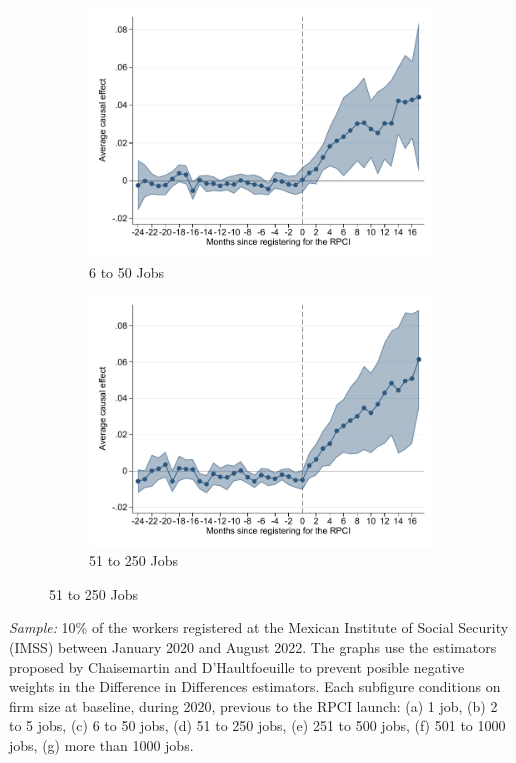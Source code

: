 \documentclass[oneside,11pt]{article}
\begin{document}
\begin{figure}[H]
\begin{center}
    \begin{subfigure}{0.49\textwidth}
    \caption{6 to 50 Jobs}
    \includegraphics[width=\textwidth]{04_Figures/muestra_10porciento/event_study_log_sal_cierre_chaisemartin_firm_size_3.pdf}
    \end{subfigure}
    \begin{subfigure}{0.49\textwidth}
    \caption{51 to 250 Jobs}
    \includegraphics[width=\textwidth]{04_Figures/muestra_10porciento/event_study_log_sal_cierre_chaisemartin_firm_size_4.pdf}
    \end{subfigure}
    
    \end{center}
\end{figure}
\scriptsize{
\noindent \textit{Sample:} 10\% of the workers registered at the Mexican Institute of Social Security (IMSS) between January 2020 and August 2022. The graphs use the estimators proposed by Chaisemartin and D'Haultfoeuille to prevent posible negative weights in the Difference in Differences estimators.  Each subfigure conditions on firm size at baseline, during 2020, previous to the RPCI launch: (a) 1 job, (b) 2 to 5 jobs, (c) 6 to 50 jobs, (d) 51 to 250 jobs, (e) 251 to 500 jobs, (f) 501 to 1000 jobs, (g) more than 1000 jobs.
}
\end{document}
